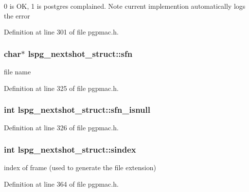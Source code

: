 0 is O\-K, 1 is postgres complained. Note current implemention automatically logs the error 



Definition at line 301 of file pgpmac.\-h.

\hypertarget{structlspg__nextshot__struct_a03252bba597b081edc9d08b20b558cc7}{
\subsubsection[{sfn}]{\setlength{\rightskip}{0pt plus 5cm}char$\ast$ lspg\-\_\-nextshot\-\_\-struct\-::sfn}}\label{structlspg__nextshot__struct_a03252bba597b081edc9d08b20b558cc7}


file name 



Definition at line 325 of file pgpmac.\-h.

\hypertarget{structlspg__nextshot__struct_a56f32eb413b1fca9f085874eb86294de}{
\subsubsection[{sfn\-\_\-isnull}]{\setlength{\rightskip}{0pt plus 5cm}int lspg\-\_\-nextshot\-\_\-struct\-::sfn\-\_\-isnull}}\label{structlspg__nextshot__struct_a56f32eb413b1fca9f085874eb86294de}


Definition at line 326 of file pgpmac.\-h.

\hypertarget{structlspg__nextshot__struct_a5d096f2c2bf9be29c44129b54eaf01da}{
\subsubsection[{sindex}]{\setlength{\rightskip}{0pt plus 5cm}int lspg\-\_\-nextshot\-\_\-struct\-::sindex}}\label{structlspg__nextshot__struct_a5d096f2c2bf9be29c44129b54eaf01da}


index of frame (used to generate the file extension) 



Definition at line 364 of file pgpmac.\-h.

